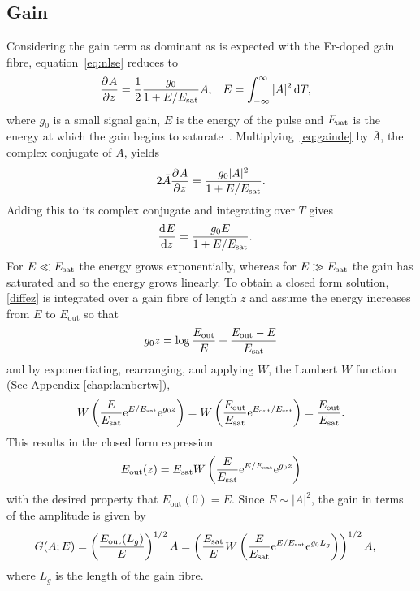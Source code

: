 \subsection{Gain}
Considering the gain term as dominant as is expected with the Er-doped gain fibre, equation~\eqref{eq:nlse} reduces to
\begin{align}
\label{eq:gainde}
	\frac{\partial^{}A}{\partial{z}^{}} &= \frac{1}{2} \frac{g_0}{1 + E / E_{\textrm{sat}}} A,& E &= \int_{-\infty}^\infty |A|^2 \, \textrm{d} T,
\end{align}
where $g_0$ is a small signal gain, $E$ is the energy of the pulse and $E_{\textrm{sat}}$ is the energy at which the gain begins to saturate~\cite{bohun, burgoyne2014, shtyrina, silfvast, yarutkina, peng}.
Multiplying~\eqref{eq:gainde} by $\bar{A}$, the complex conjugate of $A$, yields
\begin{align*}
	2\bar{A} \frac{\partial^{}A}{\partial{z}^{}} = \frac{g_0 |A|^2}{1 + E / E_{\textrm{sat}}}.
\end{align*}
Adding this to its complex conjugate and integrating over $T$ gives
\begin{align}
\label{diffez}
	\frac{\textrm{d}^{}E}{\textrm{d}{z}^{}} &= \frac{g_0 E}{1 + E / E_{\textrm{sat}}}.
\end{align}
For $E \ll E_{\textrm{sat}}$ the energy grows exponentially, whereas for $E \gg E_{\textrm{sat}}$ the gain has saturated and so the energy grows linearly. To obtain a closed form solution, \eqref{diffez} is integrated over a gain fibre of length $z$ and assume the energy increases from $E$ to $E_{\textrm{out}}$ so that
\[
	g_0 z = \log\frac{E_{\textrm{out}}}{E} + \frac{E_{\textrm{out}}-E}{E_{\textrm{sat}}}
\]
and by exponentiating, rearranging, and applying $W$, the Lambert $W$ function (See Appendix \ref{chap:lambertw}),
\[
	 W\left(\frac{E}{E_{\textrm{sat}}} \textrm{e}^{E/E_{\textrm{sat}}} \textrm{e}^{g_0 z}\right) = 
	 W\left(\frac{E_{\textrm{out}}}{E_{\textrm{sat}}} \textrm{e}^{E_{\textrm{out}}/E_{\textrm{sat}}}\right) = \frac{E_{\textrm{out}}}{E_{\textrm{sat}}}.
\]
This results in the closed form expression
\begin{align}
\label{eq:energy}
	E_{\textrm{out}}(z) = E_{\textrm{sat}} W \left( \frac{E}{E_{\textrm{sat}}} \textrm{e}^{E/E_{\textrm{sat}}} \textrm{e}^{g_0 z} \right)
\end{align}
with the desired property that $E_{\textrm{out}}(0)=E$. Since $E \sim |A|^2$, the gain in terms of the amplitude is given by
\begin{align}
	\label{eq:gain}
	G(A;E) &= \left(\frac{E_{\textrm{out}}(L_g)}{E}\right)^{1/2}A = \left( \frac{E_{\textrm{sat}}}{E} W \left( \frac{E}{E_{\textrm{sat}}} \textrm{e}^{E/E_{\textrm{sat}}} 
	\textrm{e}^{g_0 L_g} \right) \right)^{1/2} A,
\end{align}
where $L_g$ is the length of the gain fibre.

